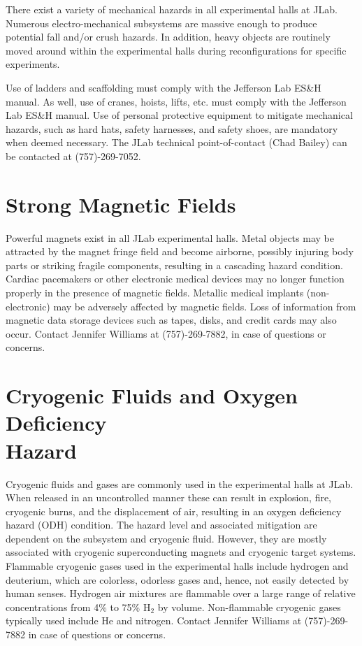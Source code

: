 \documentclass[12pt]{report}
\begin{document}
There exist a variety of mechanical hazards in all experimental halls at JLab. Numerous 
electro-mechanical subsystems are massive enough to produce potential fall and/or crush 
hazards.  In addition, heavy objects are routinely moved around within the experimental 
halls during reconfigurations for specific experiments. 

Use of ladders and scaffolding must comply with the Jefferson Lab ES\&H manual. As well,
use of cranes, hoists, lifts, etc. must comply with the Jefferson Lab ES\&H manual. Use
of personal protective equipment to mitigate mechanical hazards, 
such as hard hats, safety harnesses, and safety shoes, are mandatory when deemed necessary.
The JLab technical point-of-contact (Chad Bailey) can be contacted at (757)-269-7052.

\section{Strong Magnetic Fields}

Powerful magnets exist in all JLab experimental halls. Metal objects may be attracted 
by the magnet fringe field and become airborne, possibly injuring body parts or striking 
fragile components, resulting in a cascading hazard condition. Cardiac pacemakers or other 
electronic medical devices may no longer function properly in the presence of magnetic 
fields. Metallic medical implants (non-electronic) may be adversely affected by magnetic 
fields. Loss of information from magnetic data storage devices such as tapes, disks, and 
credit cards may also occur. Contact Jennifer Williams at (757)-269-7882, in case of questions
or concerns.

\section{Cryogenic Fluids and Oxygen Deficiency \\Hazard}

Cryogenic fluids and gases are commonly used in the experimental halls at JLab. When 
released in an uncontrolled manner these can result in explosion, fire, cryogenic burns, 
and the displacement of air, resulting in an oxygen deficiency hazard (ODH) condition. 
The hazard level and associated mitigation are dependent on the subsystem and cryogenic 
fluid. However, they are mostly associated with cryogenic superconducting magnets and 
cryogenic target systems. Flammable cryogenic gases used in the experimental halls 
include hydrogen and deuterium, which are colorless, odorless gases and, hence, not easily 
detected by human senses. Hydrogen air mixtures are flammable over a large range of relative 
concentrations from 4\% to 75\% H$_2$ by volume. Non-flammable cryogenic gases typically 
used include He and nitrogen. Contact Jennifer Williams at (757)-269-7882 in case of questions
or concerns.
\end{document}
